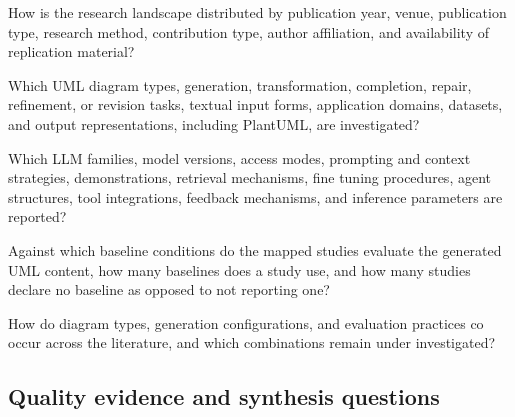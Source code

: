 \begin{description}[style=nextline,leftmargin=2.0cm,labelwidth=1.5cm]
    \item[MQ1.] How is the research landscape distributed by publication year, venue, publication type, research method, contribution type, author affiliation, and availability of replication material?
    \item[MQ2.] Which UML diagram types, generation, transformation, completion, repair, refinement, or revision tasks, textual input forms, application domains, datasets, and output representations, including PlantUML, are investigated?
    \item[MQ3.] Which LLM families, model versions, access modes, prompting and context strategies, demonstrations, retrieval mechanisms, fine tuning procedures, agent structures, tool integrations, feedback mechanisms, and inference parameters are reported?
    \item[MQ4.] Against which baseline conditions do the mapped studies evaluate the generated UML content, how many baselines does a study use, and how many studies declare no baseline as opposed to not reporting one?
    \item[MQ5.] How do diagram types, generation configurations, and evaluation practices co occur across the literature, and which combinations remain under investigated?
\end{description}

\subsection{Quality evidence and synthesis questions}

